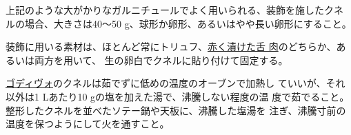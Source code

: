 上記のような大がかりなガルニチュールでよく用いられる、装飾を施したクネ
ルの場合、大きさは40〜50 g、球形か卵形、あるいはやや長い卵形にすること。

装飾に用いる素材は、ほとんど常にトリュフ、\protect\hyperlink{saumure-liquide-pour-langues}{赤く漬けた舌
肉}のどちらか、あるいは両方を用いて、
生の卵白でクネルに貼り付けて固定する。

\protect\hyperlink{godiveau}{ゴディヴォ}のクネルは茹でずに低めの温度のオーブンで加熱し
ていいが、それ以外は1 Lあたり10 gの塩を加えた湯で、沸騰しない程度の温
度で茹でること。整形したクネルを並べたソテー鍋や天板に、沸騰した塩湯を
注ぎ、沸騰寸前の温度を保つようにして火を通すこと。
